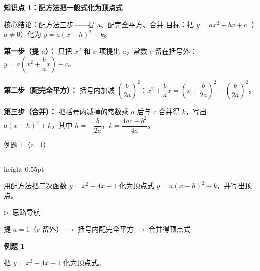 \documentclass{exam-zh}
\newcommand{\edukai}{\kaishu}
\newcommand{\eduSectionTitle}[1]{%
  \needspace{5\baselineskip}%
  \vspace{2mm}
  {\color{edu-blue}\bfseries\large #1}\par
  \vspace{3mm}
}
\newenvironment{eduSubQuestionItem}[1]{%
  \needspace{4\baselineskip}%
  \vspace{2mm}
  \par\noindent
  \hangindent=8mm\hangafter=1
  {\color{edu-blue}\bfseries #1}\enspace
  \begingroup
  \color{edu-ink}
}{%
  \endgroup
  \par
  \vspace{3mm}
}
\newenvironment{eduAuxItem}[1]{%
  \needspace{4\baselineskip}%
  \vspace{2mm}
  \par\noindent
  \hangindent=8mm\hangafter=1
  {\color{edu-blue}\edukai $\triangleright$~#1}\enspace
  \begingroup
  \color{edu-ink}
  \edukai
}{%
  \endgroup
  \par
  \vspace{4mm}
}
\newenvironment{eduProblemBlock}[1][题目]{%
  \needspace{8\baselineskip}
  {\small\color{edu-muted}#1}\par
  \vspace{1.5mm}
  {\color{edu-blue}\hrule height 0.55pt}
  \vspace{4.5mm}
  \begingroup
  \color{edu-ink}
  \large
  \setlength{\parskip}{2.2mm}
  \linespread{1.20}\selectfont
}{%
  \par
  \endgroup
  \vspace{6mm}
}
\begin{document}
\eduSectionTitle{知识点 1：配方法把一般式化为顶点式}


\begin{eduSolutionBox}{核心结论：配方法三步——提 a、配完全平方、合并}
  \begingroup
  \setlength{\parskip}{2.5mm}
目标：把 $y=ax^2+bx+c$（$a\ne0$）化为 $y=a(x-h)^2+k$。\par
\textbf{第一步（提 $a$）：} 只把 $x^2$ 和 $x$ 项提出 $a$，常数 $c$ 留在括号外：$y=a\!\left(x^2+\dfrac{b}{a}x\right)+c$。\par
\textbf{第二步（配完全平方）：} 括号内加减 $\left(\dfrac{b}{2a}\right)^2$：$x^2+\dfrac{b}{a}x=\left(x+\dfrac{b}{2a}\right)^2-\left(\dfrac{b}{2a}\right)^2$。\par
\textbf{第三步（合并）：} 把括号内减掉的常数乘 $a$ 后与 $c$ 合并得 $k$，写出 $a(x-h)^2+k$，其中 $h=-\dfrac{b}{2a}$，$k=\dfrac{4ac-b^2}{4a}$。\par
  \endgroup
\end{eduSolutionBox}




\begin{eduProblemBlock}[例题 1（a=1）]
用配方法把二次函数 $y=x^2-4x+1$ 化为顶点式 $y=a(x-h)^2+k$，并写出顶点。

\end{eduProblemBlock}





\begin{eduAuxItem}{思路导航}
提 $a=1$（$c$ 留外）$\;\to\;$括号内配完全平方$\;\to\;$合并得顶点式\end{eduAuxItem}




\begin{eduSubQuestionItem}{例题 1}
把 $y=x^2-4x+1$ 化为顶点式。\end{eduSubQuestionItem}
\end{document}
